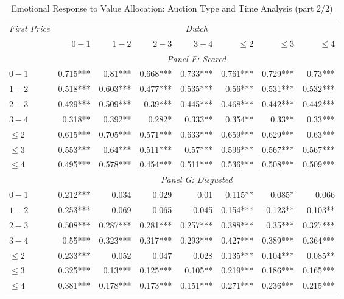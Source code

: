 \documentclass[]{article}
\begin{document}
\begin{table}[!htb] 

\caption{Emotional Response to Value Allocation: Auction Type and Time Analysis (part 2/2)} 

\label{tab:emotionalResponse} 

\centering 

\begingroup 

\scriptsize 

\begin{tabular}{lrrrrrrr} 

\toprule
\emph{First Price} & \multicolumn{7}{c}{\emph{Dutch}} \\ 

\cmidrule(lr){2-8} 
 & $0-1$ & $1-2$ & $2-3$ & $3-4$ & $\leq 2$ & $\leq 3$ & $\leq 4$ \\ 

\cmidrule(lr){2-8} 

& \multicolumn{7}{c}{\emph{Panel F: Scared}}\\ 

\cmidrule(lr){1-1} \cmidrule(lr){2-8}
$0-1$ & 0.715***  & 0.81***   & 0.668***  & 0.733***  & 0.761***  & 0.729***  & 0.73***   \\ 
  $1-2$ & 0.518***  & 0.603***  & 0.477***  & 0.535***  & 0.56***   & 0.531***  & 0.532***  \\ 
  $2-3$ & 0.429***  & 0.509***  & 0.39***   & 0.445***  & 0.468***  & 0.442***  & 0.442***  \\ 
  $3-4$ & 0.318**   & 0.392**   & 0.282*    & 0.333**   & 0.354**   & 0.33**    & 0.33***   \\ 
$\leq 2$ & 0.615***  & 0.705***  & 0.571***  & 0.633***  & 0.659***  & 0.629***  & 0.63***   \\ 
$\leq 3$ & 0.553***  & 0.64***   & 0.511***  & 0.57***   & 0.596***  & 0.567***  & 0.567***  \\ 
$\leq 4$ & 0.495***  & 0.578***  & 0.454***  & 0.511***  & 0.536***  & 0.508***  & 0.509***  \\ 
\cmidrule(lr){2-8} 

& \multicolumn{7}{c}{\emph{Panel G: Disgusted}}\\ 

\cmidrule(lr){1-1} \cmidrule(lr){2-8}
$0-1$ & 0.212***  & 0.034     & 0.029     & 0.01      & 0.115**   & 0.085*    & 0.066     \\ 
  $1-2$ & 0.253***  & 0.069     & 0.065     & 0.045     & 0.154***  & 0.123**   & 0.103**   \\ 
  $2-3$ & 0.508***  & 0.287***  & 0.281***  & 0.257***  & 0.388***  & 0.35***   & 0.327***  \\ 
  $3-4$ & 0.55***   & 0.323***  & 0.317***  & 0.293***  & 0.427***  & 0.389***  & 0.364***  \\ 
$\leq 2$ & 0.233***  & 0.052     & 0.047     & 0.028     & 0.135***  & 0.104***  & 0.085**   \\ 
$\leq 3$ & 0.325***  & 0.13***   & 0.125***  & 0.105**   & 0.219***  & 0.186***  & 0.165***  \\ 
$\leq 4$ & 0.381***  & 0.178***  & 0.173***  & 0.151***  & 0.271***  & 0.236***  & 0.215***  \\ 
\cmidrule(lr){2-8} 


\end{tabular}
\end{table}
\end{document}
